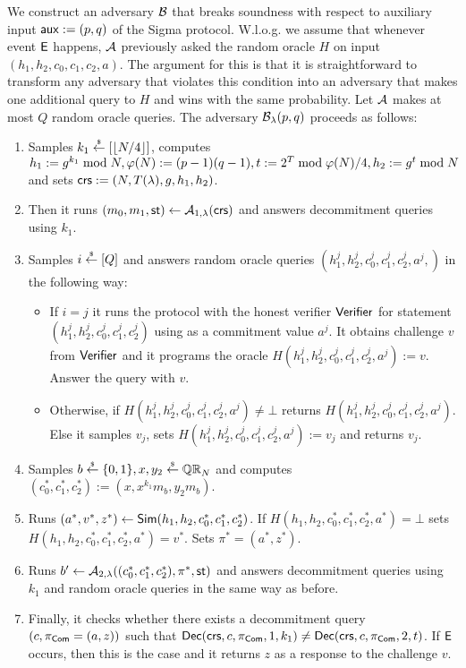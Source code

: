 We construct an adversary $\mathcal{B}$ that breaks soundness with respect to auxiliary input $\mathsf{aux}:=(p,q)$ of the Sigma protocol. W.l.o.g. we assume that whenever event $\mathsf{E}$ happens, $\mathcal{A}$ previously asked the random oracle $H$ on input $(h_1,h_2,c_0,c_1,c_2,a)$. The argument for this is that it is straightforward to transform any adversary that violates this condition into an adversary that makes one additional query to $H$ and wins with the same probability. Let $\mathcal{A}$ makes at most $Q$ random oracle queries. 
The adversary $\mathcal{B}_{\lambda}(p,q)$ proceeds as follows:
\vspace{-2mm}
\begin{enumerate}
\item Samples $k_1\stackrel{{\scriptscriptstyle\$}}{\leftarrow} [\left\lfloor N/4 \right\rfloor]$, computes $h_1 := g^{k_1} \bmod N,\varphi(N):=(p-1)(q-1), t:=2^{T} \bmod \varphi(N)/4, h_2:=g^t \bmod N$ and sets $\mathsf{crs}:=(N, T(\lambda), g, h_1, h_2)$. 
\item Then it runs $(m_0, m_1, \mathsf{st}) \leftarrow \mathcal{A}_{1, \lambda}(\mathsf{crs})$ and answers decommitment queries using $k_1$.
\item Samples $i \stackrel{{\scriptscriptstyle\$}}{\leftarrow} [Q]$ and answers random oracle queries $(h_1^j, h_2^j, c_0^j,c_1^j,c_2^j,a^j,)$ in the following way:
\begin{itemize}
\item If $i=j$ it runs the protocol with the honest verifier $\mathsf{Verifier}$ for statement $(h_1^j, h_2^j, c_0^j,c_1^j,c_2^j)$ using as a commitment value $a^j$. It obtains challenge $v$ from $\mathsf{Verifier}$ and it programs the oracle $H(h_1^j, h_2^j,c_0^j,c_1^j,c_2^j,a^j):=v$. Answer the query with $v$.
\item Otherwise, if $H(h_1^j, h_2^j,c_0^j,c_1^j,c_2^j,a^j) \neq \bot$ returns $H(h_1^j, h_2^j,c_0^j,c_1^j,c_2^j,a^j)$. Else it samples $v_j$, sets $H(h_1^j, h_2^j,c_0^j,c_1^j,c_2^j,a^j):=v_j$ and returns $v_j$.
\end{itemize}
\item Samples $b \stackrel{{\scriptscriptstyle\$}}{\leftarrow} \{0,1\}, x, y_2 \stackrel{{\scriptscriptstyle\$}}{\leftarrow} \mathbb{QR}_N$ and computes $(c_0^*, c_1^*, c_2^*):=(x, x^{k_1} m_b,\allowbreak y_2 m_b)$. 
\item Runs $(a^*,v^*,z^*) \leftarrow \mathsf{Sim}(h_1, h_2, c_0^*, c_1^*, c_2^*)$. If $H(h_1, h_2, c_0^*, c_1^*, c_2^*,a^*) = \bot$ sets $H(h_1, h_2, c_0^*, c_1^*, c_2^*,a^*) = v^*$. Sets $\pi^* = (a^*,z^*)$.
\item Runs $b' \leftarrow \mathcal{A}_{2, \lambda}((c_0^*, c_1^*, c_2^*), \pi^*, \mathsf{st})$ and answers decommitment queries using $k_1$ and random oracle queries in the same way as before.
\item Finally, it checks whether there exists a decommitment query $(c, \pi_{\mathsf{Com}}=(a,z))$ such that $\mathsf{Dec}(\mathsf{crs}, c, \pi_{\mathsf{Com}}, 1, k_1) \neq \mathsf{Dec}(\mathsf{crs},c, \pi_{\mathsf{Com}}, 2 ,t)$. If $\mathsf{E}$ occurs, then this is the case and it returns $z$ as a response to the challenge $v$. 
\end{enumerate}

